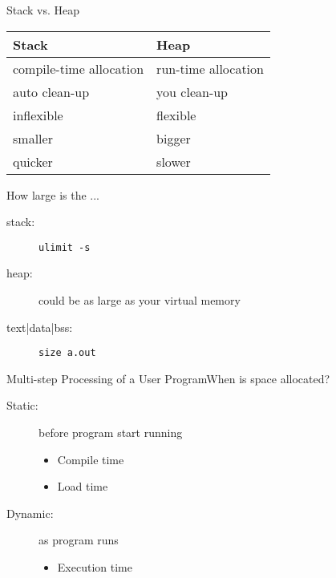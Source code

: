 \begin{frame}{Stack vs. Heap}
  \begin{center}
    \begin{tabular}{ll}\toprule
      \textbf{Stack}           &\textbf{Heap}\\\midrule
      compile-time allocation &run-time allocation\\
      auto clean-up           &you clean-up\\
      inflexible              &flexible\\
      smaller                 &bigger\\
      quicker                 &slower\\\bottomrule
    \end{tabular}
  \end{center}
  \begin{block}{How large is the ...}
    \begin{description}
    \item[stack:] \texttt{ulimit -s}
    \item[heap:] could be as large as your virtual memory
    \item[text|data|bss:] \texttt{size a.out}
    \end{description}
  \end{block}
\end{frame}

\begin{frame}{Multi-step Processing of a User Program}{When is space
    allocated?}
  \begin{minipage}{.3\textwidth}
    \label{reg}
  \end{minipage}
  \begin{minipage}{.55\textwidth}
    \begin{small}
      \begin{description}
      \item[Static:] before program start running
        \begin{itemize}
        \item Compile time
        \item Load time
        \end{itemize}
      \item[Dynamic:] as program runs
        \begin{itemize}
        \item Execution time
        \end{itemize}
      \end{description}
    \end{small}
  \end{minipage}
\end{frame}

